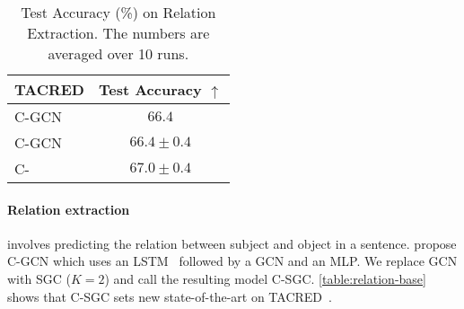 \begin{table}[t!]
\centering
\caption{Test Accuracy (\%) on Relation Extraction. The numbers are averaged over 10 runs.}
\label{table:relation-base}
\begin{tabular}{l|c}
\toprule
TACRED & Test Accuracy $\uparrow$ \\
\midrule
C-GCN \citep{relation-extraction} & $66.4$ \\
C-GCN & $66.4 \pm{0.4}$\\
{\color{modelblue} C-\method{}} & $67.0 \pm{0.4}$\\
 \bottomrule
\end{tabular}
\end{table}

\paragraph{Relation extraction} involves predicting the relation between subject and object in a sentence.
\citet{relation-extraction} propose C-GCN which uses an LSTM~\citep{LSTM} followed by a GCN and an MLP.
We replace GCN with SGC ($K=2$) and call the resulting model C-SGC. \autoref{table:relation-base} shows that C-SGC sets new state-of-the-art on TACRED~\citep{TACRED}.

\begin{table}[t!]
\centering
\small
\caption{Top-1 accuracy (\%) averaged over 10 runs in the 2-hop and 3-hop setting of the zero-shot image task on ImageNet. ADGPM~\citep{ADGPM} and EXEM 1-nns~\citep{EXEM} use more powerful visual features.}
\label{table:zero_shot}
\end{table}


